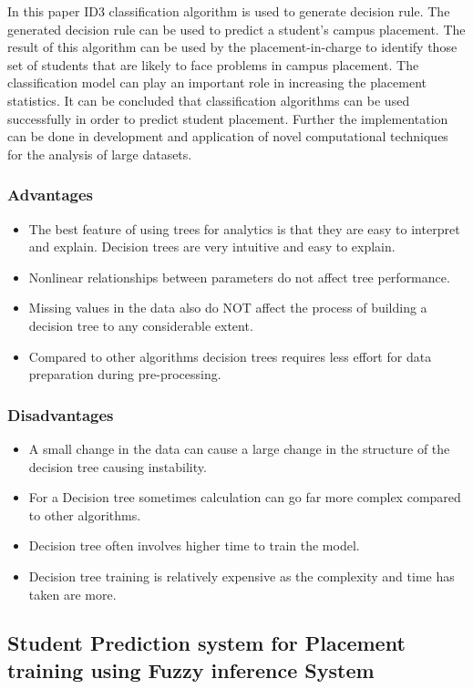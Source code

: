\documentclass[12pt]{article}
\begin{document}
In this paper ID3 classification algorithm is used to 
generate decision rule. The generated decision rule can be 
used to predict a student’s campus placement. The result of 
this algorithm can be used by the placement-in-charge to 
identify those set of students that are likely to face 
problems in campus placement. The classification model 
can play an important role in increasing the placement 
statistics. It can be concluded that classification algorithms 
can be used successfully in order to predict student 
placement. Further the implementation can be done in 
development and application of novel computational 
techniques for the analysis of large datasets.
\newpage
\subsubsection{Advantages}
\begin{itemize}
\item The best feature of using trees for analytics is that they are easy to interpret and explain. Decision trees are very intuitive and easy to explain.
\item  Nonlinear relationships between parameters do not affect tree performance.
\item Missing values in the data also do NOT affect the process of building a decision tree to any considerable extent. 
\item Compared to other algorithms decision trees requires less effort for data preparation during pre-processing.
\end{itemize}
\vspace{10px}
\subsubsection{Disadvantages}
\begin{itemize}
\item A small change in the data can cause a large change in the structure of the decision tree causing instability.
\item For a Decision tree sometimes calculation can go far more complex compared to other algorithms.
\item Decision tree often involves higher time to train the model.
\item Decision tree training is relatively expensive as the complexity and time has taken are more.
\end{itemize}
\newpage
\subsection{Student Prediction system for Placement training using Fuzzy inference System}
\vspace*{10px}
\end{document}

